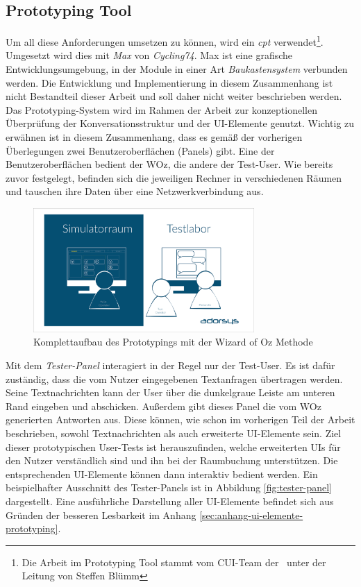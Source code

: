 \subsection{Prototyping Tool}
\label{subsec:prototyping-tool}

Um all diese Anforderungen umsetzen zu können, wird ein \textit{\ac{cpt}} verwendet\footnote{Die Arbeit im Prototyping Tool stammt vom \ac{CUI}-Team der \adorsys\ unter der Leitung von Steffen Blümm}. Umgesetzt wird dies mit \textit{Max} von \textit{Cycling74}. Max ist eine grafische Entwicklungsumgebung, in der Module in einer Art \textit{Baukastensystem} verbunden werden. Die Entwicklung und Implementierung in diesem Zusammenhang ist nicht Bestandteil dieser Arbeit und soll daher nicht weiter beschrieben werden. Das Prototyping-System wird im Rahmen der Arbeit zur konzeptionellen Überprüfung der Konversationsstruktur und der \ac{UI}-Elemente genutzt. Wichtig zu erwähnen ist in diesem Zusammenhang, dass es gemäß der vorherigen Überlegungen zwei Benutzeroberflächen (Panels) gibt. Eine der Benutzeroberflächen bedient der \acl{WOz}, die andere der Test-User. Wie bereits zuvor festgelegt, befinden sich die jeweiligen Rechner in verschiedenen Räumen und tauschen ihre Daten über eine Netzwerkverbindung aus. 
\newline

\begin{figure}[H]
    \centering
    \includegraphics[width=0.75\textwidth]{bilder/WizardOfOz_v3.png}
    \caption{Komplettaufbau des Prototypings mit der Wizard of Oz Methode}
    \label{fig:wizard-of-oz-v3}
\end{figure}

Mit dem \textit{Tester-Panel} interagiert in der Regel nur der Test-User. Es ist dafür zuständig, dass die vom Nutzer eingegebenen Textanfragen übertragen werden. Seine Textnachrichten kann der User über die dunkelgraue Leiste am unteren Rand eingeben und abschicken. Außerdem gibt dieses Panel die vom \acl{WOz} generierten Antworten aus. Diese können, wie schon im vorherigen Teil der Arbeit beschrieben, sowohl Textnachrichten als auch erweiterte \ac{UI}-Elemente sein. Ziel dieser prototypischen User-Tests ist herauszufinden, welche erweiterten \aclp{UI} für den Nutzer verständlich sind und ihn bei der Raumbuchung unterstützen. Die entsprechenden \ac{UI}-Elemente können dann interaktiv bedient werden. Ein beispielhafter Ausschnitt des Tester-Panels ist in Abbildung \ref{fig:tester-panel} dargestellt. Eine ausführliche Darstellung aller \ac{UI}-Elemente befindet sich aus Gründen der besseren Lesbarkeit im Anhang \ref{sec:anhang-ui-elemente-prototyping}.
\newline

